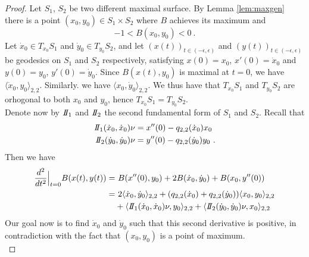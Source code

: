\begin{proof}
    Let $S_1$, $S_2$ be two different maximal surface. By Lemma \ref{lem:maxgen} there is a point $(x_0,y_0)\in S_1 \times S_2$ where $B$ achieves its maximum and 
    \[
        -1 < B(x_0,y_0) < 0 \ .
    \]
    Let $\dot{x}_0 \in T_{x_0}S_1$ and $\dot{y}_0 \in T_{y_0}S_2$, and let $(x(t))_{t\in(-\epsilon, \epsilon)}$ and $(y(t))_{t\in(-\epsilon, \epsilon)}$ be geodesics on $S_1$ and $S_2$ respectively, satisfying $x(0) = x_0$, $x'(0) = \dot{x}_0$ and $y(0) = y_0$, $y'(0) = \dot{y}_0$.
    Since $B(x(t), y_0)$ is maximal at $t=0$, we have $\langle \dot{x}_0,y_0 \rangle_{2,2}$. Similarly. we have $\langle x_0, \dot{y}_0 \rangle_{2,2}$. We thus have that $T_{x_0}S_1$ and $T_{y_0}S_2$ are orhogonal to both $x_0$ and $y_0$, hence $T_{x_0}S_1 = T_{y_0}S_2$.\\
    Denote now by $\II_1$ and $\II_2$ the second fundamental form of $S_1$ and $S_2$. Recall that
    \[
    \begin{split}
        \II_1(\dot{x}_0,\dot{x}_0)\nu  & = x''(0) - q_{2,2}(\dot{x}_0) x_0 \\
        \II_2(\dot{y}_0,\dot{y}_0)\nu  & = y''(0) - q_{2,2}(\dot{y}_0) y_0 \ .
    \end{split}    
    \]
    Then we have
    \[ 
    \begin{split}
        \frac{d^2}{dt^2}\Big|_{t=0} B(x(t),y(t))  = & \ B(x''(0), y_0) + 2B(\dot{x}_0, \dot{y}_0) + B(x_0, y''(0)) \\
         = & \ 2\langle \dot{x}_0, \dot{y}_0 \rangle_{2,2} + (q_{2,2}(\dot{x}_0) + q_{2,2}(\dot{y}_0)) \langle x_0, y_0 \rangle_{2,2} \\
         & + \langle  \II_1(\dot{x}_0,\dot{x}_0)\nu , y_0 \rangle_{2,2} + \langle \II_2(\dot{y}_0,\dot{y}_0)\nu , x_0 \rangle_{2,2}
    \end{split}
    \]
    Our goal now is to find $\dot{x}_0$ and $\dot{y}_0$ such that this second derivative is positive, in contradiction with the fact that $(x_0, y_0)$ is a point of maximum.\\
\end{proof}

